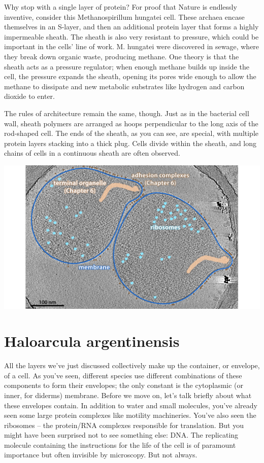 \documentclass[]{tufte-book}
\begin{document}
Why stop with a single layer of protein? For proof that Nature is
endlessly inventive, consider this Methanospirillum hungatei cell. These
archaea encase themselves in an S-layer, and then an additional protein
layer that forms a highly impermeable sheath. The sheath is also very
resistant to pressure, which could be important in the cells' line of
work. M. hungatei were discovered in sewage, where they break down
organic waste, producing methane. One theory is that the sheath acts as
a pressure regulator; when enough methane builds up inside the cell, the
pressure expands the sheath, opening its pores wide enough to allow the
methane to dissipate and new metabolic substrates like hydrogen and
carbon dioxide to enter.

The rules of architecture remain the same, though. Just as in the
bacterial cell wall, sheath polymers are arranged as hoops perpendicular
to the long axis of the rod-shaped cell. The ends of the sheath, as you
can see, are special, with multiple protein layers stacking into a thick
plug. Cells divide within the sheath, and long chains of cells in a
continuous sheath are often observed.

\includegraphics{img/02_static/2_1_Mgenitalium}

\section{Haloarcula argentinensis}\label{haloarcula-argentinensis}

All the layers we've just discussed collectively make up the container,
or envelope, of a cell. As you've seen, different species use different
combinations of these components to form their envelopes; the only
constant is the cytoplasmic (or inner, for diderms) membrane. Before we
move on, let's talk briefly about what these envelopes contain. In
addition to water and small molecules, you've already seen some large
protein complexes like motility machineries. You've also seen the
ribosomes -- the protein/RNA complexes responsible for translation. But
you might have been surprised not to see something else: DNA. The
replicating molecule containing the instructions for the life of the
cell is of paramount importance but often invisible by microscopy. But
not always.
\end{document}
